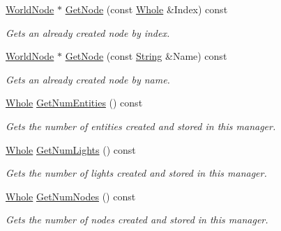 \begin{DoxyCompactItemize}
\hyperlink{classMezzanine_1_1WorldNode}{WorldNode} $\ast$ \hyperlink{classMezzanine_1_1SceneManager_a8bc6cd34431d1059d3e30fa20ec3c94f}{GetNode} (const \hyperlink{namespaceMezzanine_adcbb6ce6d1eb4379d109e51171e2e493}{Whole} \&Index) const 
\begin{DoxyCompactList}\small\item\em Gets an already created node by index. \item\end{DoxyCompactList}\item 
\hyperlink{classMezzanine_1_1WorldNode}{WorldNode} $\ast$ \hyperlink{classMezzanine_1_1SceneManager_a35fb2ab086d5cce5c7554d27e4d5a800}{GetNode} (const \hyperlink{namespaceMezzanine_acf9fcc130e6ebf08e3d8491aebcf1c86}{String} \&Name) const 
\begin{DoxyCompactList}\small\item\em Gets an already created node by name. \item\end{DoxyCompactList}\item 
\hyperlink{namespaceMezzanine_adcbb6ce6d1eb4379d109e51171e2e493}{Whole} \hyperlink{classMezzanine_1_1SceneManager_a409f664d4383b33700cba40f7ab99bbb}{GetNumEntities} () const 
\begin{DoxyCompactList}\small\item\em Gets the number of entities created and stored in this manager. \item\end{DoxyCompactList}\item 
\hyperlink{namespaceMezzanine_adcbb6ce6d1eb4379d109e51171e2e493}{Whole} \hyperlink{classMezzanine_1_1SceneManager_aa1cafdcd750fda2452db42cb3ddf365c}{GetNumLights} () const 
\begin{DoxyCompactList}\small\item\em Gets the number of lights created and stored in this manager. \item\end{DoxyCompactList}\item 
\hyperlink{namespaceMezzanine_adcbb6ce6d1eb4379d109e51171e2e493}{Whole} \hyperlink{classMezzanine_1_1SceneManager_ae78bda0af2b0f11f32d283d5cf83086f}{GetNumNodes} () const 
\begin{DoxyCompactList}\small\item\em Gets the number of nodes created and stored in this manager. \item\end{DoxyCompactList}\item 

\end{DoxyCompactItemize}
